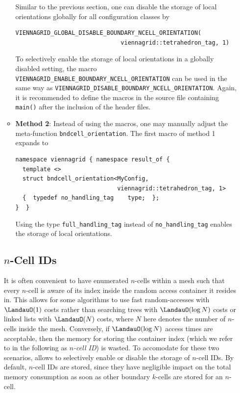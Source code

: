 \begin{itemize}
\begin{itemize}
Similar to the previous section, one can disable the storage of local orientations globally for all configuration classes by
\begin{lstlisting}
VIENNAGRID_GLOBAL_DISABLE_BOUNDARY_NCELL_ORIENTATION(
                              viennagrid::tetrahedron_tag, 1) 
\end{lstlisting}
To selectively enable the storage of local orientations in a globally disabled setting, the macro \lstinline|VIENNAGRID_ENABLE_BOUNDARY_NCELL_ORIENTATION| can be used in the same way as \lstinline|VIENNAGRID_DISABLE_BOUNDARY_NCELL_ORIENTATION|.
Again, it is recommended to define the macros in the source file containing \lstinline|main()| after the inclusion of the {\ViennaGrid} header files.

 \item \textbf{Method 2}: Instead of using the macros, one may manually adjust the meta-function \lstinline|bndcell_orientation|. The first macro of method 1 expands to
 \begin{lstlisting}
namespace viennagrid { namespace result_of {
  template <>
  struct bndcell_orientation<MyConfig,
                             viennagrid::tetrahedron_tag, 1>
  {  typedef no_handling_tag    type;  };
}  }
 \end{lstlisting}
Using the type \lstinline|full_handling_tag| instead of \lstinline|no_handling_tag| enables the storage of local orientations.
\end{itemize}


\subsection{$n$-Cell IDs} \label{subsec:ncell-ids}
It is often convenient to have enumerated $n$-cells within a mesh such that every $n$-cell is aware of its index inside the random access container it resides in. This allows for some algorithms to use fast random-accesses with $\LandauO(1)$ costs rather than searching trees with $\LandauO(\log N)$ costs or linked lists with $\LandauO(N)$ costs, where $N$ here denotes the number of $n$-cells inside the mesh. Conversely, if $\LandauO(\log N)$ access times are acceptable, then the memory for storing the container index (which we refer to in the following as \emph{$n$-cell ID}) is wasted. To accomodate for these two scenarios, {\ViennaGrid} allows to selectively enable or disable the storage of $n$-cell IDs. By default, $n$-cell IDs are stored, since they have negligible impact on the total memory consumption as soon as other boundary $k$-cells are stored for an $n$-cell.


\end{itemize}
